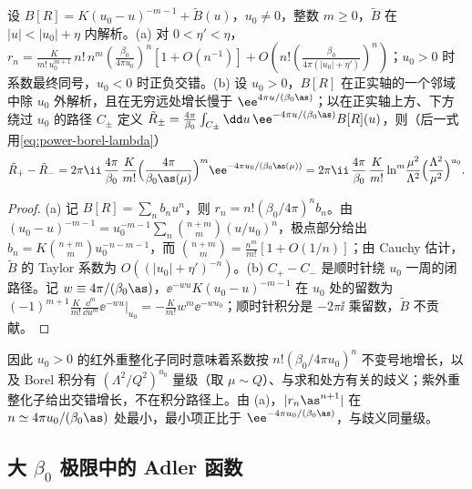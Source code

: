 \begin{lemma}\label{lem:power-borel-pole}
设 $B[R]=K(u_0-u)^{-m-1}+\tilde B(u)$，$u_0\ne0$，整数 $m\ge0$，$\tilde B$ 在 $|u|<|u_0|+\eta$ 内解析。(a) 对 $0<\eta'<\eta$，$r_n=\frac{K}{m!\,u_0^{m+1}}\,n!\,n^m(\frac{\beta_0}{4\pi u_0})^n[1+O(n^{-1})]+O(n!(\frac{\beta_0}{4\pi(|u_0|+\eta')})^n)$；$u_0>0$ 时系数最终同号，$u_0<0$ 时正负交错。(b) 设 $u_0>0$，$B[R]$ 在正实轴的一个邻域中除 $u_0$ 外解析，且在无穷远处增长慢于 $\ee^{4\pi u/(\beta_0\as)}$；以在正实轴上方、下方绕过 $u_0$ 的路径 $C_\pm$ 定义 $\tilde R_\pm=\frac{4\pi}{\beta_0}\int_{C_\pm}\dd u\,\ee^{-4\pi u/(\beta_0\as)}B[R](u)$，则（后一式用\eqref{eq:power-borel-lambda}）
\begin{equation*}
\tilde R_+-\tilde R_-=2\pi\ii\,\frac{4\pi}{\beta_0}\,\frac{K}{m!}\Big(\frac{4\pi}{\beta_0\as(\mu)}\Big)^m\ee^{-4\pi u_0/(\beta_0\as(\mu))}
=2\pi\ii\,\frac{4\pi}{\beta_0}\,\frac{K}{m!}\ln^m\!\frac{\mu^2}{\Lambda^2}\Big(\frac{\Lambda^2}{\mu^2}\Big)^{u_0}.
\end{equation*}
\end{lemma}

\begin{proof}
(a) 记 $B[R]=\sum_nb_nu^n$，则 $r_n=n!(\beta_0/4\pi)^nb_n$。由 $(u_0-u)^{-m-1}=u_0^{-m-1}\sum_n\binom{n+m}{m}(u/u_0)^n$，极点部分给出 $b_n=K\binom{n+m}{m}u_0^{-n-m-1}$，而 $\binom{n+m}{m}=\frac{n^m}{m!}[1+O(1/n)]$；由 Cauchy 估计，$\tilde B$ 的 Taylor 系数为 $O((|u_0|+\eta')^{-n})$。(b) $C_+-C_-$ 是顺时针绕 $u_0$ 一周的闭路径。记 $w\equiv4\pi/(\beta_0\as)$，$\ee^{-wu}K(u_0-u)^{-m-1}$ 在 $u_0$ 处的留数为 $(-1)^{m+1}\frac{K}{m!}\frac{\dd^m}{\dd u^m}\ee^{-wu}\big|_{u_0}=-\frac{K}{m!}w^m\ee^{-wu_0}$；顺时针积分是 $-2\pi\ii$ 乘留数，$\tilde B$ 不贡献。
\end{proof}

因此 $u_0>0$ 的红外重整化子同时意味着系数按 $n!(\beta_0/4\pi u_0)^n$ 不变号地增长，以及 Borel 积分有 $(\Lambda^2/Q^2)^{u_0}$ 量级（取 $\mu\sim Q$）、与求和处方有关的歧义；紫外重整化子给出交错增长，不在积分路径上。由 (a)，$|r_n\as^{n+1}|$ 在 $n\simeq4\pi u_0/(\beta_0\as)$ 处最小，最小项正比于 $\ee^{-4\pi u_0/(\beta_0\as)}$，与歧义同量级。

\subsection{大 \texorpdfstring{$\beta_0$}{beta0} 极限中的 Adler 函数}

